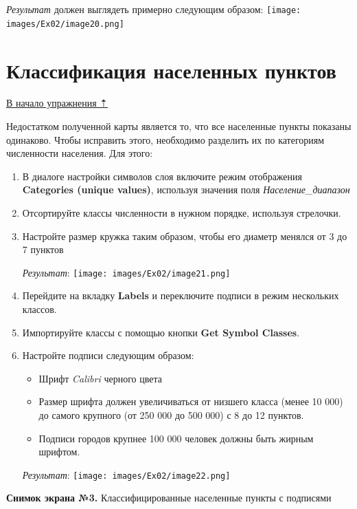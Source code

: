 \documentclass[12pt,]{book}
\providecommand{\tightlist}{%
  \setlength{\itemsep}{0pt}\setlength{\parskip}{0pt}}
\begin{document}
\emph{Результат} должен выглядеть примерно следующим образом:
\texttt{[image: images/Ex02/image20.png]}

\hypertarget{map-design-general-cities}{%
\section{Классификация населенных пунктов}\label{map-design-general-cities}}

\protect\hyperlink{map-design-general}{В начало упражнения ⇡}

Недостатком полученной карты является то, что все населенные пункты показаны одинаково. Чтобы исправить этого, необходимо разделить их по категориям численности населения. Для этого:

\begin{enumerate}
\def\labelenumi{\arabic{enumi}.}
\item
  В диалоге настройки символов слоя включите режим отображения \textbf{Categories (unique values)}, используя значения поля \emph{Население\_диапазон}
\item
  Отсортируйте классы численности в нужном порядке, используя стрелочки.
\item
  Настройте размер кружка таким образом, чтобы его диаметр менялся от 3 до 7 пунктов

  \emph{Результат}:
  \texttt{[image: images/Ex02/image21.png]}
\item
  Перейдите на вкладку \textbf{Labels} и переключите подписи в режим нескольких классов.
\item
  Импортируйте классы с помощью кнопки \textbf{Get Symbol Classes}.
\item
  Настройте подписи следующим образом:

  \begin{itemize}
  \tightlist
  \item
    Шрифт \emph{Calibri} черного цвета
  \item
    Размер шрифта должен увеличиваться от низшего класса (менее 10 000) до самого крупного (от 250 000 до 500 000) с 8 до 12 пунктов.
  \item
    Подписи городов крупнее 100 000 человек должны быть жирным шрифтом.
  \end{itemize}

  \emph{Результат}:
  \texttt{[image: images/Ex02/image22.png]}
\end{enumerate}

\textbf{Снимок экрана №3.} Классифицированные населенные пункты с подписями
\end{document}
